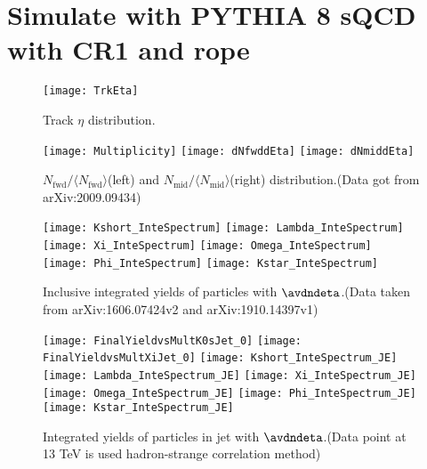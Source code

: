 
\section{Simulate with PYTHIA 8 sQCD with CR1 and rope}%
\label{sec:CRorRope}

\begin{figure}[t]
        \begin{center}
                \texttt{[image: TrkEta]}
        \end{center}
        \caption{Track $\eta$ distribution.}
        \label{fig:TrkEta}
\end{figure}

\begin{figure}[t]
	\begin{center}
		\texttt{[image: Multiplicity]}
		\texttt{[image: dNfwddEta]}
		\texttt{[image: dNmiddEta]}
	\end{center}
	\caption{$N_\mathrm{fwd}/\langle N_\mathrm{fwd}\rangle$(left) and $N_\mathrm{mid}/\langle N_\mathrm{mid}\rangle$(right) distribution.(Data got from arXiv:2009.09434)}
	\label{fig:TrkdNdEta}
\end{figure}

\begin{figure}[ht]
	\begin{center}
		\texttt{[image: Kshort\_InteSpectrum]}
		\texttt{[image: Lambda\_InteSpectrum]}
		\texttt{[image: Xi\_InteSpectrum]}
		\texttt{[image: Omega\_InteSpectrum]}
		\texttt{[image: Phi\_InteSpectrum]}
		\texttt{[image: Kstar\_InteSpectrum]}
	\end{center}
	\caption{Inclusive integrated yields of particles with $\avdndeta$.(Data taken from arXiv:1606.07424v2 and arXiv:1910.14397v1)}
	\label{fig:InclIntePar}
\end{figure}
\begin{figure}[ht]
	\begin{center}
		\texttt{[image: FinalYieldvsMultK0sJet\_0]}
		\texttt{[image: FinalYieldvsMultXiJet\_0]}
		\texttt{[image: Kshort\_InteSpectrum\_JE]}
		\texttt{[image: Lambda\_InteSpectrum\_JE]}
		\texttt{[image: Xi\_InteSpectrum\_JE]}
		\texttt{[image: Omega\_InteSpectrum\_JE]}
		\texttt{[image: Phi\_InteSpectrum\_JE]}
		\texttt{[image: Kstar\_InteSpectrum\_JE]}
	\end{center}
	\caption{Integrated yields of particles in jet with $\avdndeta$.(Data point at 13 TeV is used hadron-strange correlation method)}
	\label{fig:JCIntePar}
\end{figure}

